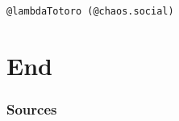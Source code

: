 \documentclass[aspectratio=169,x11names]{beamer}
\begin{document}
\begin{frame}
\begin{center}
\texttt{@lambdaTotoro (@chaos.social)}
\end{center}
\end{frame}


\section{End}

\begin{frame}
\frametitle{Sources}
\end{frame}

\end{document}
